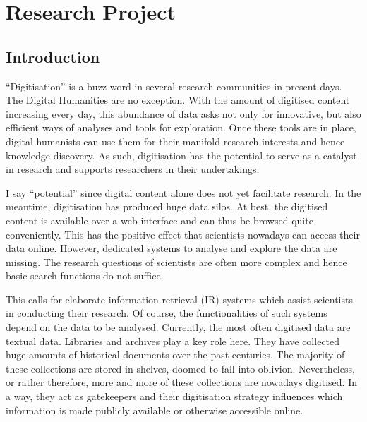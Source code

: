 \section{Research Project}
\subsection{Introduction}
``Digitisation'' is a buzz-word in several research communities in present days. The Digital Humanities are no exception. With the amount of digitised content increasing every day, this abundance of data asks not only for innovative, but also efficient ways of analyses and tools for exploration. Once these tools are in place, digital humanists can use them for their manifold research interests and hence knowledge discovery. As such, digitisation has the potential to serve as a catalyst in research and supports researchers in their undertakings.

I say ``potential'' since digital content alone does not yet facilitate research. In the meantime, digitisation has produced huge data silos. At best, the digitised content is available over a web interface and can thus be browsed quite conveniently. This has the positive effect that scientists nowadays can access their data online. However, dedicated systems to analyse and explore the data are missing. The research questions of scientists are often more complex and hence basic search functions do not suffice.

This calls for elaborate information retrieval (IR) systems which assist scientists in conducting their research. Of course, the functionalities of such systems depend on the data to be analysed. Currently, the most often digitised data are textual data. Libraries and archives play a key role here. They have collected huge amounts of historical documents over the past centuries. The majority of these collections are stored in shelves, doomed to fall into oblivion. Nevertheless, or rather therefore, more and more of these collections are nowadays digitised. In a way, they act as gatekeepers and their digitisation strategy influences which information is made publicly available or otherwise accessible online.  

